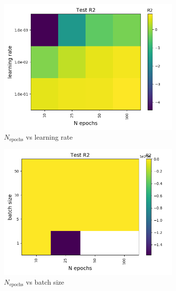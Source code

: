 \documentclass[a4paper]{article}
\newcommand{\Nepochs}{N_{\text{epochs}}}
\begin{document}
\begin{figure}[H]
  \centering
  \begin{subfigure}{0.49\textwidth}
    \includegraphics[scale=0.45]{../figures/task_a/test_p15/heatmap_test_p15_lr_constant_Nhyp4434_R2_n_epochs_eta0.png}
    \caption{$\Nepochs$ vs learning rate}
  \end{subfigure}
  \begin{subfigure}{0.49\textwidth}
    \includegraphics[scale=0.45]{../figures/task_a/test_p15/heatmap_test_p15_lr_constant_Nhyp4434_R2_n_epochs_bsize.png}
    \caption{$\Nepochs$ vs batch size}
  \end{subfigure}\\
  \begin{subfigure}{0.49\textwidth}

\end{subfigure}
\end{figure}
\end{document}
